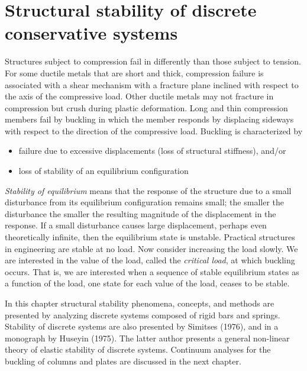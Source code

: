 \documentclass{AeroStructure-ERJohnson}
\begin{document}
\mainmatter

\setcounter{page}{265}

\setcounter{chapter}{9}

\chapter{Structural stability of discrete conservative systems}\label{ch10}

Structures subject to compression fail in differently than those subject to tension. For some ductile metals that are short and thick, compression failure is associated with a shear mechanism with a fracture plane inclined with respect to the axis of the compressive load. Other ductile metals may not fracture in compression but crush during plastic deformation. Long and thin compression members fail by buckling in which the member responds by displacing sideways with respect to the direction of the compressive load. Buckling is characterized by
\begin{itemize}
  \item failure due to excessive displacements (loss of structural stiffness), and/or
  \item loss of stability of an equilibrium configuration
\end{itemize}

\textit{Stability of equilibrium} means that the response of the structure due to a small disturbance from its equilibrium configuration remains small; the smaller the disturbance the smaller the resulting magnitude of the displacement in the response. If a small disturbance causes large displacement, perhaps even theoretically infinite, then the equilibrium state is unstable. Practical structures in engineering are stable at no load. Now consider increasing the load slowly. We are interested in the value of the load, called the \textit{critical load}, at which buckling occurs. That is, we are interested when a sequence of stable equilibrium states as a function of the load, one state for each value of the load, ceases to be stable.

In this chapter structural stability phenomena, concepts, and methods are presented by analyzing discrete systems composed of rigid bars and springs. Stability of discrete systems are also presented by Simitses (1976), and in a monograph by Huseyin (1975). The latter author presents a general non-linear theory of elastic stability of discrete systems. Continuum analyses for the buckling of columns and plates are discussed in the next chapter.
\end{document}
